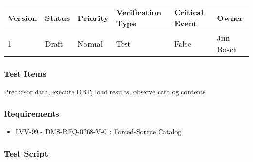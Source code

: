 \begin{longtable}[]{@{}llllll@{}}
\toprule
Version & Status & Priority & Verification Type & Critical Event &
Owner\tabularnewline
\midrule
\endhead
1 & Draft & Normal & Test & False & Jim Bosch\tabularnewline
\bottomrule
\end{longtable}

\hypertarget{test-items-42}{%
\subsubsection{Test Items}\label{test-items-42}}

Precursor data, execute DRP, load results, observe catalog contents

\hypertarget{requirements-43}{%
\subsubsection{Requirements}\label{requirements-43}}

\begin{itemize}
\tightlist
\item
  \href{https://jira.lsstcorp.org/browse/LVV-99}{LVV-99} -
  DMS-REQ-0268-V-01: Forced-Source Catalog
\end{itemize}

\hypertarget{test-script-43}{%
\subsubsection{Test Script}\label{test-script-43}}

